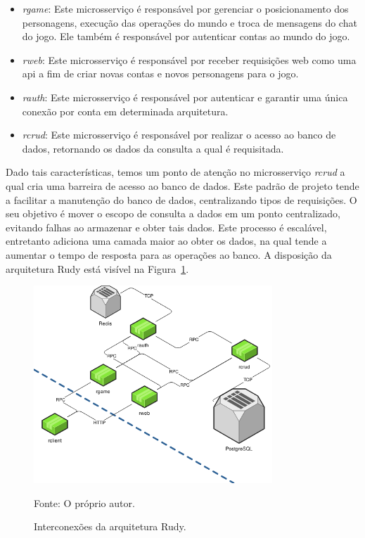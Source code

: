 \begin{itemize}
  \item \textit{rgame}: Este microsserviço é responsável por gerenciar o posicionamento dos personagens, execução das operações do mundo e troca de mensagens do chat do jogo. Ele também é responsável por autenticar contas ao mundo do jogo.
  \item \textit{rweb}: Este microsserviço é responsável por receber requisições web como uma \ac{api} a fim de criar novas contas e novos personagens para o jogo.
  \item \textit{rauth}: Este microsserviço é responsável por autenticar e garantir uma única conexão por conta em determinada arquitetura.
  \item \textit{rcrud}: Este microsserviço é responsável por realizar o acesso ao banco de dados, retornando os dados da consulta a qual é requisitada.
\end{itemize}



Dado tais características, temos um ponto de atenção no microsserviço \textit{rcrud} a qual cria uma barreira de acesso ao banco de dados.
%
Este padrão de projeto tende a facilitar a manutenção do banco de dados, centralizando tipos de requisições.
%
O seu objetivo é mover o escopo de consulta a dados em um ponto centralizado, evitando falhas ao armazenar e obter tais dados.
%
Este processo é escalável, entretanto adiciona uma camada maior ao obter os dados, na qual tende a aumentar o tempo de resposta para as operações ao banco.
%
A disposição da arquitetura Rudy está visível na Figura~\ref{fig:interconexao_rudy}.



\begin{figure}[htb!]
  \caption{Interconexões da arquitetura Rudy.}
  \label{fig:interconexao_rudy}
  \includegraphics[width=0.8\textwidth]{figuras/interconexoes/rudy.png}
  \centering

  Fonte: O próprio autor.
\end{figure}



